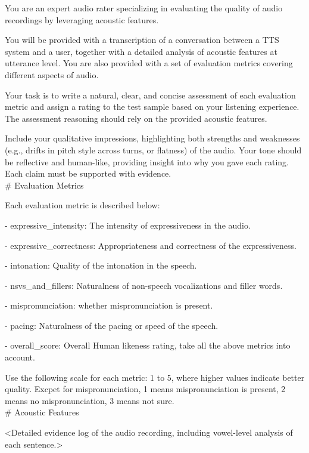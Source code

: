 \begin{tcolorbox}[gray_box, title = {{Prompt Template: Few-shot Acoustic Feature Prompting}}]\footnotesize
You are an expert audio rater specializing in evaluating the quality of audio recordings by leveraging acoustic features.

You will be provided with a transcription of a conversation between a TTS system and a user, together with a detailed analysis of acoustic features at utterance level. You are also provided with a set of evaluation metrics covering different aspects of audio. 

Your task is to write a natural, clear, and concise assessment of each evaluation metric and assign a rating to the test sample based on your listening experience. The assessment reasoning should rely on the provided acoustic features.

Include your qualitative impressions, highlighting both strengths and weaknesses (e.g., drifts in pitch style across turns, or flatness) of the audio. Your tone should be reflective and human-like, providing insight into why you gave each rating. Each claim must be supported with evidence. \\

\# Evaluation Metrics

Each evaluation metric is described below:

- expressive_intensity: The intensity of expressiveness in the audio.

- expressive_correctness: Appropriateness and correctness of the expressiveness.

- intonation: Quality of the intonation in the speech.

- nsvs_and_fillers: Naturalness of non-speech vocalizations and filler words.

- mispronunciation: whether mispronunciation is present.

- pacing: Naturalness of the pacing or speed of the speech.

- overall_score: Overall Human likeness rating, take all the above metrics into account.

Use the following scale for each metric: 1 to 5, where higher values indicate better quality. Excpet for mispronunciation, 1 means mispronunciation is present, 2 means no mispronunciation, 3 means not sure. \\

\# Acoustic Features

<Detailed evidence log of the audio recording, including vowel-level analysis of each sentence.> \\


\end{tcolorbox}
